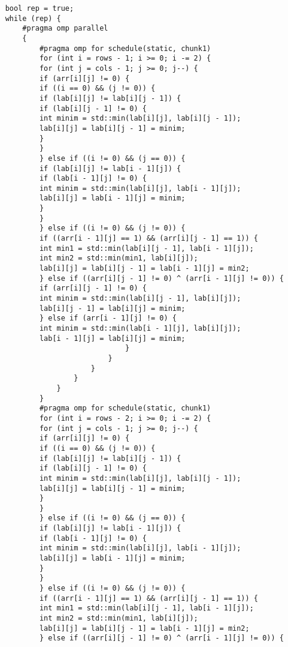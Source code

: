 \documentclass{report}
\begin{document}
\begin{lstlisting}
    bool rep = true;
    while (rep) {
        #pragma omp parallel
        {
            #pragma omp for schedule(static, chunk1)
            for (int i = rows - 1; i >= 0; i -= 2) {
            for (int j = cols - 1; j >= 0; j--) {
            if (arr[i][j] != 0) {
            if ((i == 0) && (j != 0)) {
            if (lab[i][j] != lab[i][j - 1]) {
            if (lab[i][j - 1] != 0) {
            int minim = std::min(lab[i][j], lab[i][j - 1]);
            lab[i][j] = lab[i][j - 1] = minim;
            }
            }
            } else if ((i != 0) && (j == 0)) {
            if (lab[i][j] != lab[i - 1][j]) {
            if (lab[i - 1][j] != 0) {
            int minim = std::min(lab[i][j], lab[i - 1][j]);
            lab[i][j] = lab[i - 1][j] = minim;
            }
            }
            } else if ((i != 0) && (j != 0)) {
            if ((arr[i - 1][j] == 1) && (arr[i][j - 1] == 1)) {
            int min1 = std::min(lab[i][j - 1], lab[i - 1][j]);
            int min2 = std::min(min1, lab[i][j]);
            lab[i][j] = lab[i][j - 1] = lab[i - 1][j] = min2;
            } else if ((arr[i][j - 1] != 0) ^ (arr[i - 1][j] != 0)) {
            if (arr[i][j - 1] != 0) {
            int minim = std::min(lab[i][j - 1], lab[i][j]);
            lab[i][j - 1] = lab[i][j] = minim;
            } else if (arr[i - 1][j] != 0) {
            int minim = std::min(lab[i - 1][j], lab[i][j]);
            lab[i - 1][j] = lab[i][j] = minim;
                                }
                            }
                        }
                    }
                }
            }
            #pragma omp for schedule(static, chunk1)
            for (int i = rows - 2; i >= 0; i -= 2) {
            for (int j = cols - 1; j >= 0; j--) {
            if (arr[i][j] != 0) {
            if ((i == 0) && (j != 0)) {
            if (lab[i][j] != lab[i][j - 1]) {
            if (lab[i][j - 1] != 0) {
            int minim = std::min(lab[i][j], lab[i][j - 1]);
            lab[i][j] = lab[i][j - 1] = minim;
            }
            }
            } else if ((i != 0) && (j == 0)) {
            if (lab[i][j] != lab[i - 1][j]) {
            if (lab[i - 1][j] != 0) {
            int minim = std::min(lab[i][j], lab[i - 1][j]);
            lab[i][j] = lab[i - 1][j] = minim;
            }
            }
            } else if ((i != 0) && (j != 0)) {
            if ((arr[i - 1][j] == 1) && (arr[i][j - 1] == 1)) {
            int min1 = std::min(lab[i][j - 1], lab[i - 1][j]);
            int min2 = std::min(min1, lab[i][j]);
            lab[i][j] = lab[i][j - 1] = lab[i - 1][j] = min2;
            } else if ((arr[i][j - 1] != 0) ^ (arr[i - 1][j] != 0)) {

\end{lstlisting}
\end{document}
